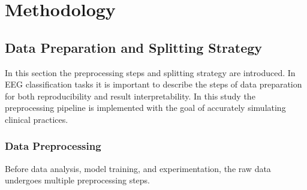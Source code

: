 \chapter{Methodology}
\label{chap:methodology}

\section{Data Preparation and Splitting Strategy}

In this section the preprocessing steps and splitting strategy are introduced. In EEG classification tasks it is important to describe the steps of data preparation for both reproducibility and result interpretability. In this study the preprocessing pipeline is implemented with the goal of accurately simulating clinical practices.

\subsection{Data Preprocessing}

Before data analysis, model training, and experimentation, the raw data undergoes multiple preprocessing steps. 

